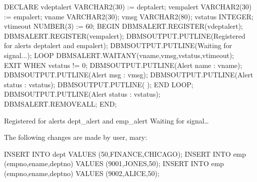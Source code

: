 \documentclass[letterpaper,10pt,english,openany,oneside]{sphinxmanual}
\begin{document}
%
\begin{sphinxVerbatim}[commandchars=\\\{\}]
DECLARE
     v\PYGZus{}dept\PYGZus{}alert     VARCHAR2(30) := \PYGZsq{}dept\PYGZus{}alert\PYGZsq{};
     v\PYGZus{}emp\PYGZus{}alert      VARCHAR2(30) := \PYGZsq{}emp\PYGZus{}alert\PYGZsq{};
     v\PYGZus{}name           VARCHAR2(30);
     v\PYGZus{}msg            VARCHAR2(80);
     v\PYGZus{}status         INTEGER;
     v\PYGZus{}timeout        NUMBER(3) := 60;
BEGIN
     DBMS\PYGZus{}ALERT.REGISTER(v\PYGZus{}dept\PYGZus{}alert);
     DBMS\PYGZus{}ALERT.REGISTER(v\PYGZus{}emp\PYGZus{}alert);
     DBMS\PYGZus{}OUTPUT.PUT\PYGZus{}LINE(\PYGZsq{}Registered for alerts dept\PYGZus{}alert and emp\PYGZus{}alert\PYGZsq{});
     DBMS\PYGZus{}OUTPUT.PUT\PYGZus{}LINE(\PYGZsq{}Waiting for signal...\PYGZsq{});
     LOOP
         DBMS\PYGZus{}ALERT.WAITANY(v\PYGZus{}name,v\PYGZus{}msg,v\PYGZus{}status,v\PYGZus{}timeout);
         EXIT WHEN v\PYGZus{}status != 0;
         DBMS\PYGZus{}OUTPUT.PUT\PYGZus{}LINE(\PYGZsq{}Alert name   : \PYGZsq{} \textbar{}\textbar{} v\PYGZus{}name);
         DBMS\PYGZus{}OUTPUT.PUT\PYGZus{}LINE(\PYGZsq{}Alert msg    : \PYGZsq{} \textbar{}\textbar{} v\PYGZus{}msg);
         DBMS\PYGZus{}OUTPUT.PUT\PYGZus{}LINE(\PYGZsq{}Alert status : \PYGZsq{} \textbar{}\textbar{} v\PYGZus{}status);
         DBMS\PYGZus{}OUTPUT.PUT\PYGZus{}LINE(\PYGZsq{}\PYGZhy{}\PYGZhy{}\PYGZhy{}\PYGZhy{}\PYGZhy{}\PYGZhy{}\PYGZhy{}\PYGZhy{}\PYGZhy{}\PYGZhy{}\PYGZhy{}\PYGZhy{}\PYGZhy{}\PYGZhy{}\PYGZhy{}\PYGZhy{}\PYGZhy{}\PYGZhy{}\PYGZhy{}\PYGZhy{}\PYGZhy{}\PYGZhy{}\PYGZhy{}\PYGZhy{}\PYGZhy{}\PYGZhy{}\PYGZhy{}\PYGZhy{}\PYGZhy{}\PYGZhy{}\PYGZhy{}\PYGZhy{}\PYGZhy{}\PYGZhy{}\PYGZhy{}\PYGZhy{}\PYGZsq{} \textbar{}\textbar{}
       \PYGZsq{}\PYGZhy{}\PYGZhy{}\PYGZhy{}\PYGZhy{}\PYGZhy{}\PYGZhy{}\PYGZhy{}\PYGZhy{}\PYGZhy{}\PYGZhy{}\PYGZhy{}\PYGZhy{}\PYGZhy{}\PYGZhy{}\PYGZhy{}\PYGZhy{}\PYGZhy{}\PYGZhy{}\PYGZhy{}\PYGZhy{}\PYGZhy{}\PYGZhy{}\PYGZhy{}\PYGZhy{}\PYGZhy{}\PYGZsq{});
     END LOOP;
     DBMS\PYGZus{}OUTPUT.PUT\PYGZus{}LINE(\PYGZsq{}Alert status : \PYGZsq{} \textbar{}\textbar{} v\PYGZus{}status);
     DBMS\PYGZus{}ALERT.REMOVEALL;
END;
\end{sphinxVerbatim}

Registered for alerts dept\_alert and emp\_alert
Waiting for signal…

The following changes are made by user, mary:

%
\begin{sphinxVerbatim}[commandchars=\\\{\}]
INSERT INTO dept VALUES (50,\PYGZsq{}FINANCE\PYGZsq{},\PYGZsq{}CHICAGO\PYGZsq{});
INSERT INTO emp (empno,ename,deptno) VALUES (9001,\PYGZsq{}JONES\PYGZsq{},50);
INSERT INTO emp (empno,ename,deptno) VALUES (9002,\PYGZsq{}ALICE\PYGZsq{},50);
\end{sphinxVerbatim}
\end{document}
